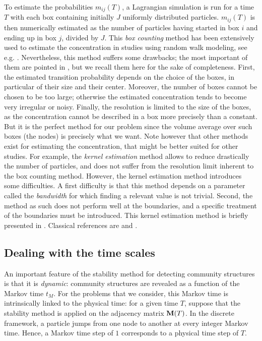 To estimate the probabilities $m_{ij}(T)$, a Lagrangian simulation is run for a time $T$ with each box containing initially $J$ uniformly distributed particles. $m_{ij}(T)$ is then numerically estimated as the number of particles having started in box $i$ and ending up in box $j$, divided by $J$. This \textit{box counting} method has been extensively used to estimate the concentration in studies using random walk modeling, see e.g. \cite{riddle1998specification}. Nevertheless, this method suffers some drawbacks; the most important of them are pointed in \cite{spivakovskaya2007lagrangian}, but we recall them here for the sake of completeness. First, the estimated transition probability depends on the choice of the boxes, in particular of their size and their center. Moreover, the number of boxes cannot be chosen to be too large; otherwise the estimated concentration tends to become very irregular or noisy. Finally, the resolution is limited to the size of the boxes, as the concentration cannot be described in a box more precisely than a constant. But it is the perfect method for our problem since the volume average over such boxes (the nodes) is precisely what we want. Note however that other methods exist for estimating the concentration, that might be better suited for other studies. For example, the \textit{kernel estimation} method allows to reduce drastically the number of particles, and does not suffer from the resolution limit inherent to the box counting method. However, the kernel estimation method introduces some difficulties. A first difficulty is that this method depends on a parameter called the \textit{bandwidth} for which finding a relevant value is not trivial. Second, the method as such does not perform well at the boundaries, and a specific treatment of the boundaries must be introduced. This kernel estimation method is briefly presented in \cite{spivakovskaya2007lagrangian}. Classical references are \cite{silverman1986density} and \cite{wand1995kernel}.

\subsection{Dealing with the time scales}
An important feature of the stability method for detecting community structures is that it is \textit{dynamic}: community structures are revealed as a function of the Markov time $t_M$. For the problems that we consider, this Markov time is intrinsically linked to the physical time: for a given time $T$, suppose that the stability method is applied on the adjacency matrix $\mathbf M(T)$. In the discrete framework, a particle jumps from one node to another at every integer Markov time. Hence, a Markov time step of $1$ corresponds to a physical time step of $T$.

